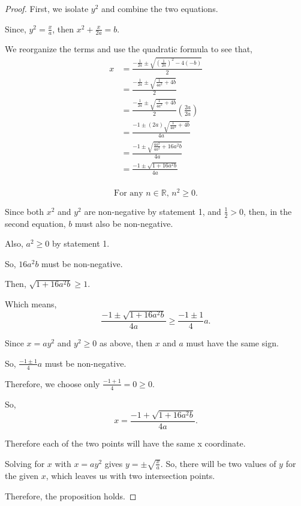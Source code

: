 \documentclass[../hw3.tex]{subfiles}
\begin{document}
\begin{proof}
    First, we isolate $y^2$ and combine the two equations.

    Since, $y^2 = \frac{x}{a}$, then $x^2+\frac{x}{2a} = b$.

    We reorganize the terms and use the quadratic formula to see that,
    \begin{align*}
        x&=\frac{{-\frac{1}{2a}} \pm \sqrt{ {\left(\frac{1}{2a}\right)}^2 - 4(-b)}}{2}\\
        &=\frac{{-\frac{1}{2a}} \pm \sqrt{\frac{1}{4a^2}+4b}}{2}\\
        &=\frac{{-\frac{1}{2a}} \pm \sqrt{\frac{1}{4a^2}+4b}}{2} \left(\frac{2a}{2a}\right)\\
        &=\frac{-1 \pm (2a)\sqrt{\frac{1}{4a^2} + 4b}}{4a}\\
        &=\frac{-1 \pm \sqrt{\frac{4a^2}{4a^2} + 16a^2b}}{4a}\\
        &=\frac{-1 \pm \sqrt{1 + 16a^2b}}{4a}\\
    \end{align*}

    \begin{equation}
        \mbox{For any $n \in \mathbb{R}$, $n^2 \geq 0$.}    
    \end{equation}
    
    Since both $x^2$ and $y^2$ are non-negative by statement 1, and $\frac{1}{2}>0$, then, in the second equation, $b$ must also be non-negative.

    Also, $a^2 \geq 0$ by statement 1.

    So, $16a^2b$ must be non-negative.

    Then, $\sqrt{1 + 16a^2b} \geq 1$.

    Which means, \[\frac{-1 \pm \sqrt{1 + 16a^2b}}{4a} \geq \frac{-1 \pm 1}{4}a.\]

    Since $x=ay^2$ and $y^2\geq0$ as above, then $x$ and $a$ must have the same sign.

    So, $\frac{-1 \pm 1}{4}a$ must be non-negative.

    Therefore, we choose only $\frac{-1+1}{4}=0\geq0$.

    So, \[x=\frac{-1+\sqrt{1 + 16a^2b}}{4a}.\]

    Therefore each of the two points will have the same x coordinate.

    Solving for $x$ with $x=ay^2$ gives $y=\pm\sqrt{\frac{x}{a}}$. So, there will be two values of $y$ for the given $x$, which leaves us with two intersection points.

    Therefore, the proposition holds.
\end{proof}
\end{document}
